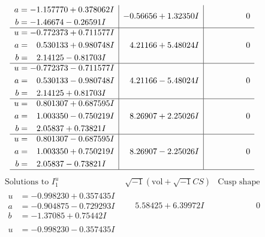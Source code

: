 \documentclass[1p]{elsarticle_modified}
\theoremstyle{definition}
\newcommand{\I}{\sqrt{-1}}
\begin{document}
$$\begin{array}{c|c|c}
\begin{aligned}
a &= -1.157770 + 0.378062 I \\
b &= -1.46674 - 0.26591 I\end{aligned}
 & -0.56656 + 1.32350 I & \phantom{-0.000000 } 0 \\ \hline\begin{aligned}
u &= -0.772373 + 0.711577 I \\
a &= \phantom{-}0.530133 + 0.980748 I \\
b &= \phantom{-}2.14125 - 0.81703 I\end{aligned}
 & \phantom{-}4.21166 + 5.48024 I & \phantom{-0.000000 } 0 \\ \hline\begin{aligned}
u &= -0.772373 - 0.711577 I \\
a &= \phantom{-}0.530133 - 0.980748 I \\
b &= \phantom{-}2.14125 + 0.81703 I\end{aligned}
 & \phantom{-}4.21166 - 5.48024 I & \phantom{-0.000000 } 0 \\ \hline\begin{aligned}
u &= \phantom{-}0.801307 + 0.687595 I \\
a &= \phantom{-}1.003350 - 0.750219 I \\
b &= \phantom{-}2.05837 + 0.73821 I\end{aligned}
 & \phantom{-}8.26907 + 2.25026 I & \phantom{-0.000000 } 0 \\ \hline\begin{aligned}
u &= \phantom{-}0.801307 - 0.687595 I \\
a &= \phantom{-}1.003350 + 0.750219 I \\
b &= \phantom{-}2.05837 - 0.73821 I\end{aligned}
 & \phantom{-}8.26907 - 2.25026 I & \phantom{-0.000000 } 0\\
 \hline 
 \end{array}$$\newpage$$\begin{array}{c|c|c}  
\text{Solutions to }I^u_{1}& \I (\text{vol} + \sqrt{-1}CS) & \text{Cusp shape}\\
 \hline 
\begin{aligned}
u &= -0.998230 + 0.357435 I \\
a &= -0.904875 - 0.729293 I \\
b &= -1.37085 + 0.75442 I\end{aligned}
 & \phantom{-}5.58425 + 6.39972 I & \phantom{-0.000000 } 0 \\ \hline\begin{aligned}
u &= -0.998230 - 0.357435 I \\

\end{aligned}
\end{array}$$
\end{document}
